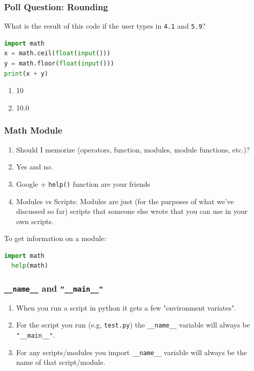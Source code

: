 \documentclass{beamer}
\begin{document}
%
%
%
\begin{frame}[fragile]
  \frametitle{Poll Question: Rounding}
  What is the result of this code if the user types in \lstinline|4.1| and \lstinline|5.9|?
  \begin{lstlisting}[language=Python, autogobble]
import math
x = math.ceil(float(input()))
y = math.floor(float(input()))
print(x + y)
  \end{lstlisting}
  \vfill
  \begin{enumerate}[A]
    \item 10
    \item 10.0
  \end{enumerate}
\end{frame}

\begin{frame}[fragile]
  \frametitle{Math Module}
  \begin{enumerate}[A]
    \item Should I memorize (operators, function, modules, module functions, etc.)?
    \pause
    \item Yes and no. 
    \pause
    \item Google + \lstinline|help()| function are your friends
    \pause
    \item Modules vs Scripts: Modules are just (for the purposes of what we've discussed so far) scripts that someone else wrote that you can use in your own scripts.
    \pause
  \end{enumerate}
  \vfill
  \pause
  To get information on a module:
  \begin{lstlisting}[language=Python, autogobble]
  import math
  help(math)
  \end{lstlisting}
\end{frame}

\begin{frame}
  \frametitle{\lstinline|__name__| and \lstinline|"__main__"|}

  \begin{enumerate}
    \item When you run a script in python it gets a few "environment variates".
    \item For the script you run (e.g, \lstinline|test.py|) the \lstinline|__name__| variable will always be \lstinline|"__main__"|.
    \item For any scripts/modules you import \lstinline|__name__| variable will always be the name of that script/module.
  \end{enumerate}
\end{frame}
\end{document}
